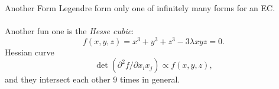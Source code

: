 \documentclass{beamer}
\begin{document}
\begin{frame}
\end{frame}

\begin{frame}
\end{frame}

\begin{frame}[t]{Another Form}
	Legendre form only one of infinitely many forms for an EC. \\~\\

	Another fun one is the \emph{Hesse cubic}: 
	$$
		f(x,y,z) = x^{3} + y^{3} + z^{3} - 3\lambda xyz = 0.
	$$
	Hessian curve 
	$$
		\det ( \partial^{2} f / \partial x_{i}x_{j} ) \propto f(x,y,z),
	$$
	and they intersect each other 9 times in general. 
\end{frame}
\end{document}
